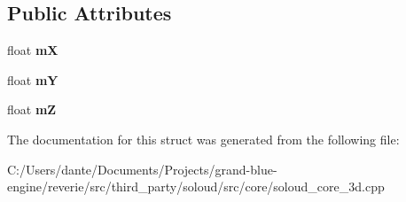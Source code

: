 \subsection*{Public Attributes}
\begin{DoxyCompactItemize}
\item 
\mbox{\label{struct_so_loud_1_1vec3_a5d4e9cb47adb7f65fc9a4162d30029b8}} 
float {\bfseries mX}
\item 
\mbox{\label{struct_so_loud_1_1vec3_abc69c8245e0276bd1424a5592c8c0b6f}} 
float {\bfseries mY}
\item 
\mbox{\label{struct_so_loud_1_1vec3_aeab708ba532d336af2c42d255f8d208c}} 
float {\bfseries mZ}
\end{DoxyCompactItemize}


The documentation for this struct was generated from the following file\+:\begin{DoxyCompactItemize}
\item 
C\+:/\+Users/dante/\+Documents/\+Projects/grand-\/blue-\/engine/reverie/src/third\+\_\+party/soloud/src/core/soloud\+\_\+core\+\_\+3d.\+cpp\end{DoxyCompactItemize}
